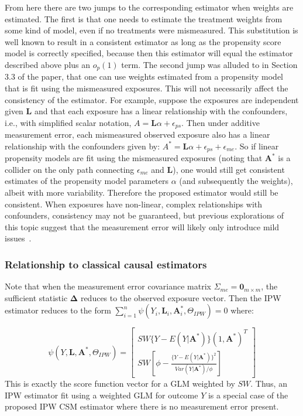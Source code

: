 \documentclass[12pt]{article}
\begin{document}
From here there are two jumps to the corresponding estimator when weights are estimated. The first is that one needs to estimate the treatment weights from some kind of model, even if no treatments were mismeasured. This substitution is well known to result in a consistent estimator as long as the propensity score model is correctly specified, because then this estimator will equal the estimator described above plus an $o_{p}(1)$ term. The second jump was alluded to in Section 3.3 of the paper, that one can use weights estimated from a propensity model that is fit using the mismeasured exposures. This will not necessarily affect the consistency of the estimator. For example, suppose the exposures are independent given $\bm{L}$ and that each exposure has a linear relationship with the confounders, i.e., with simplified scalar notation, $A = \bm{L} \alpha + \epsilon_{ps}$. Then under additive measurement error, each mismeasured observed exposure also has a linear relationship with the confounders given by: $A^{*} = \bm{L} \alpha + \epsilon_{ps} + \epsilon_{me}$. So if linear propensity models are fit using the mismeasured exposures (noting that $\bm{A}^{*}$ is a collider on the only path connecting $\epsilon_{me}$ and $\bm{L}$), one would still get consistent estimates of the propensity model parameters $\alpha$ (and subsequently the weights), albeit with more variability. Therefore the proposed estimator would still be consistent. When exposures have non-linear, complex relationships with confounders, consistency may not be guaranteed, but previous explorations of this topic suggest that the measurement error will likely only introduce mild issues~\citep{carroll2006}.

\subsubsection{Relationship to classical causal estimators}

Note that when the measurement error covariance matrix $\Sigma_{me} = \textbf{0}_{m \times m}$, the sufficient statistic $\bm{\Delta}$ reduces to the observed exposure vector. Then the IPW estimator reduces to the form $\sum_{i=1}^{n} \psi(Y_{i}, \bm{L}_{i}, \bm{A}^{*}_{i}, \Theta_{IPW}) = 0$ where:

\begin{equation*}
    \psi(Y, \bm{L}, \bm{A}^{*}, \Theta_{IPW}) =
    \begin{bmatrix}
       SW\{ Y - E(Y | \bm{A}^{*}) \} (1, \bm{A}^{*})^{T} \\
       SW \left [ \phi - \frac{ \{Y - E(Y | \bm{A}^{*}) \}^{2}}{Var(Y | \bm{A}^{*}) / \phi} \right ]
    \end{bmatrix}
\end{equation*}
This is exactly the score function vector for a GLM weighted by $SW$. Thus, an IPW estimator fit using a weighted GLM for outcome $Y$ is a special case of the proposed IPW CSM estimator where there is no measurement error present.
\end{document}
